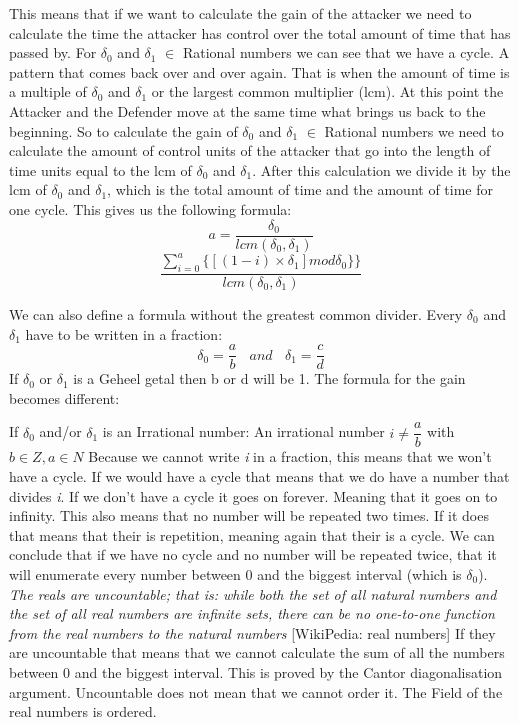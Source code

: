 This means that if we want to calculate the gain of the attacker we need to calculate the time the attacker has control over the total amount of time that has passed by.
For $\delta_{0}$ and $\delta_{1}$ $\in$ Rational numbers we can see that we have a cycle. A pattern that comes back over and over again. That is when the amount of time is a multiple of $\delta_{0}$ and $\delta_{1}$ or the largest common multiplier (lcm). At this point the Attacker and the Defender move at the same time what brings us back to the beginning.
So to calculate the gain of $\delta_{0}$ and $\delta_{1}$ $\in$ Rational numbers we need to calculate the amount of control units of the attacker that go into the length of time units equal to the lcm of  $\delta_{0}$ and $\delta_{1}$. After this calculation we divide it by the lcm of $\delta_{0} $ and $ \delta_{1}$, which is the total amount of time and the amount of time for one cycle.  This gives us the following formula:
\begin{equation}\label{first}
a = \dfrac{\delta_{0} }{lcm(\delta_{0},\delta_{1})} 
\end{equation}
\begin{equation}\label{first}
\dfrac{\sum_{i=0}^{a} \lbrace [( 1 - i ) \times \delta_{1}] mod \delta_{0} \rbrace \rbrace }{lcm(\delta_{0},\delta_{1})} 
\end{equation}

We can also define a formula without the greatest common divider. Every $\delta_{0}$ and $\delta_{1}$ have to be written in a fraction:
\begin{equation}\label{first}
\delta_{0}=\dfrac{a}{b} ~~~~and~~~~\delta_{1}=\dfrac{c}{d}
\end{equation}
If  $\delta_{0}$ or $\delta_{1}$ is a Geheel getal then b or d will be 1. The formula for the gain becomes different:\\



If $\delta_{0}$ and/or $\delta_{1}$ is an Irrational number:
An irrational number $ i \neq \dfrac{a}{b}$ with $b \in Z, a \in N$
Because we cannot write \textit{i} in a fraction, this means that we won't have a cycle. If we would have a cycle that means that we do have a number that divides \textit{i}. If we don't have a cycle it goes on forever. Meaning that it goes on to infinity. This also means that no number will be repeated two times. If it does that means that their is repetition, meaning again that their is a cycle. We can conclude that if we have no cycle and no number will be repeated twice, that it will enumerate every number between 0 and the biggest interval (which is $\delta_{0}$). 
\textit{The reals are uncountable; that is: while both the set of all natural numbers and the set of all real numbers are infinite sets, there can be no one-to-one function from the real numbers to the natural numbers} [WikiPedia: real numbers] If they are uncountable that means that we cannot calculate the sum of all the numbers between 0 and the biggest interval. This is proved by the Cantor diagonalisation argument. Uncountable does not mean that we cannot order it. The Field of the real numbers is ordered. 

